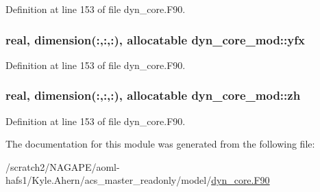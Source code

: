 Definition at line 153 of file dyn\-\_\-core.\-F90.

\subsubsection[{yfx}]{\setlength{\rightskip}{0pt plus 5cm}real, dimension(\-:,\-:,\-:), allocatable dyn\-\_\-core\-\_\-mod\-::yfx\hspace{0.3cm}{\ttfamily [private]}}\label{classdyn__core__mod_afd231d83bc8c9d07ddff91e7dfe0c0ec}


Definition at line 153 of file dyn\-\_\-core.\-F90.

\subsubsection[{zh}]{\setlength{\rightskip}{0pt plus 5cm}real, dimension(\-:,\-:,\-:), allocatable dyn\-\_\-core\-\_\-mod\-::zh\hspace{0.3cm}{\ttfamily [private]}}\label{classdyn__core__mod_ac211efe06fd0edadef972c82951f4c4f}


Definition at line 153 of file dyn\-\_\-core.\-F90.



The documentation for this module was generated from the following file\-:\begin{DoxyCompactItemize}
\item 
/scratch2/\-N\-A\-G\-A\-P\-E/aoml-\/hafs1/\-Kyle.\-Ahern/acs\-\_\-master\-\_\-readonly/model/\hyperlink{dyn__core_8F90}{dyn\-\_\-core.\-F90}\end{DoxyCompactItemize}
